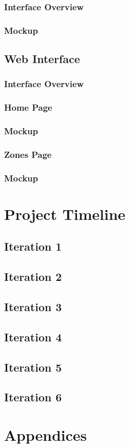 \documentclass[onecolumn, draftclsnofoot,10pt, compsoc]{IEEEtran}
\begin{document}
			\subsubsection{Interface Overview}
			\subsubsection{Mockup}
		\subsection{Web Interface}
			\subsubsection{Interface Overview}
			\subsubsection{Home Page}
			\subsubsection{Mockup}
			\subsubsection{Zones Page}
			\subsubsection{Mockup}

	\section{Project Timeline}
		\subsection{Iteration 1}
		\subsection{Iteration 2}
		\subsection{Iteration 3}
		\subsection{Iteration 4}
		\subsection{Iteration 5}
		\subsection{Iteration 6}


	\section{Appendices} %
\end{document}
